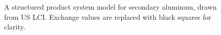 \begin{figure}
  
  \caption{A structured product system model for secondary aluminum, drawn from US LCI. Exchange values are replaced with black squares for clarity.}
  \label{table:aluminum}
\end{figure}
